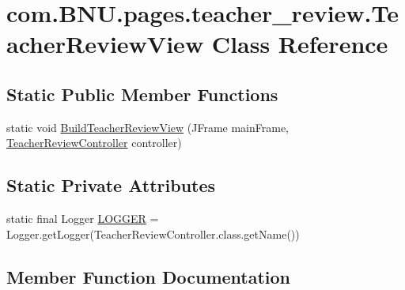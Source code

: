 \hypertarget{classcom_1_1_b_n_u_1_1pages_1_1teacher__review_1_1_teacher_review_view}{}\section{com.\+B\+N\+U.\+pages.\+teacher\+\_\+review.\+Teacher\+Review\+View Class Reference}
\label{classcom_1_1_b_n_u_1_1pages_1_1teacher__review_1_1_teacher_review_view}
\subsection*{Static Public Member Functions}
\begin{DoxyCompactItemize}
\item 
static void \mbox{\hyperlink{classcom_1_1_b_n_u_1_1pages_1_1teacher__review_1_1_teacher_review_view_a691c3544b18334c1ec0ff660407b6ae6}{Build\+Teacher\+Review\+View}} (J\+Frame main\+Frame, \mbox{\hyperlink{classcom_1_1_b_n_u_1_1pages_1_1teacher__review_1_1_teacher_review_controller}{Teacher\+Review\+Controller}} controller)
\end{DoxyCompactItemize}
\subsection*{Static Private Attributes}
\begin{DoxyCompactItemize}
\item 
static final Logger \mbox{\hyperlink{classcom_1_1_b_n_u_1_1pages_1_1teacher__review_1_1_teacher_review_view_a5287bd83c7148003b4a49b88133bbc53}{L\+O\+G\+G\+ER}} = Logger.\+get\+Logger(Teacher\+Review\+Controller.\+class.\+get\+Name())
\end{DoxyCompactItemize}


\subsection{Member Function Documentation}
\mbox{\label{classcom_1_1_b_n_u_1_1pages_1_1teacher__review_1_1_teacher_review_view_a691c3544b18334c1ec0ff660407b6ae6}} 
